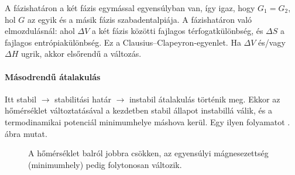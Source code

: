    A fázishatáron a két fázis egymással egyensúlyban van, így igaz, hogy $G_1=G_2$, hol $G$ az egyik és a másik fázis szabadentalpiája. A fázishatáron való elmozdulásnál:
   ahol $\Delta V$ a két fázis közötti fajlagos térfogatkülönbség, és $\Delta S$ a fajlagos entrópiakülönbség. Ez a Clausius--Clapeyron-egyenlet. Ha $\Delta V$ és/vagy $\Delta H$ ugrik, akkor elsőrendű a változás.
  
  \paragraph{Másodrendű átalakulás} 
  
   Itt stabil $\rightarrow$ stabilitási határ $\rightarrow$ instabil átalakulás történik meg. Ekkor az hőmérséklet változtatásával a kezdetben stabil állapot instabillá válik, és a termodinamikai potenciál minimumhelye máshova kerül. Egy ilyen folyamatot . ábra mutat.
  \begin{figure}[ht!]
   \centering
    \hspace{6pt}
    \hspace{6pt}
   \caption{A hőmérséklet balról jobbra csökken, az egyensúlyi mágnesezettség (minimumhely) pedig folytonosan változik.}\label{fig:B09-masodrend}
  \end{figure}
  

